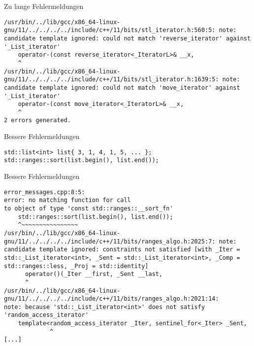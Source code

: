 \begin{frame}[fragile]{Zu lange Fehlermeldungen}
    \begin{verbatim}
/usr/bin/../lib/gcc/x86_64-linux-gnu/11/../../../../include/c++/11/bits/stl_iterator.h:560:5: note: candidate template ignored: could not match 'reverse_iterator' against '_List_iterator'
    operator-(const reverse_iterator<_IteratorL>& __x,
    ^
/usr/bin/../lib/gcc/x86_64-linux-gnu/11/../../../../include/c++/11/bits/stl_iterator.h:1639:5: note: candidate template ignored: could not match 'move_iterator' against '_List_iterator'
    operator-(const move_iterator<_IteratorL>& __x,
    ^
2 errors generated.
    \end{verbatim}
\end{frame}

\begin{frame}[fragile]{Bessere Fehlermeldungen}
    \begin{verbatim}
std::list<int> list{ 3, 1, 4, 1, 5, ... };
std::ranges::sort(list.begin(), list.end());
    \end{verbatim}
\end{frame}

\begin{frame}[fragile]{Bessere Fehlermeldungen}
    \begin{verbatim}
error_messages.cpp:8:5:
error: no matching function for call
to object of type 'const std::ranges::__sort_fn'
    std::ranges::sort(list.begin(), list.end());
    ^~~~~~~~~~~~~~~~~
/usr/bin/../lib/gcc/x86_64-linux-gnu/11/../../../../include/c++/11/bits/ranges_algo.h:2025:7: note: candidate template ignored: constraints not satisfied [with _Iter = std::_List_iterator<int>, _Sent = std::_List_iterator<int>, _Comp = std::ranges::less, _Proj = std::identity]
      operator()(_Iter __first, _Sent __last,
      ^
/usr/bin/../lib/gcc/x86_64-linux-gnu/11/../../../../include/c++/11/bits/ranges_algo.h:2021:14:
note: because 'std::_List_iterator<int>' does not satisfy
'random_access_iterator'
    template<random_access_iterator _Iter, sentinel_for<_Iter> _Sent,
             ^
[...]
    \end{verbatim}
\end{frame}

